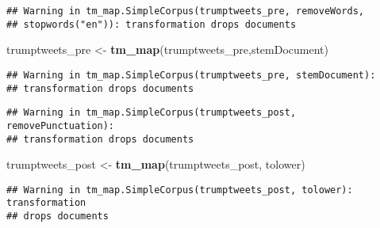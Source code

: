 \documentclass[]{article}
\newenvironment{Shaded}{\begin{snugshade}}{\end{snugshade}}
\newcommand{\KeywordTok}[1]{\textcolor[rgb]{0.13,0.29,0.53}{\textbf{#1}}}
\newcommand{\DecValTok}[1]{\textcolor[rgb]{0.00,0.00,0.81}{#1}}
\newcommand{\StringTok}[1]{\textcolor[rgb]{0.31,0.60,0.02}{#1}}
\newcommand{\OperatorTok}[1]{\textcolor[rgb]{0.81,0.36,0.00}{\textbf{#1}}}
\newcommand{\NormalTok}[1]{#1}
\begin{document}
\begin{verbatim}
## Warning in tm_map.SimpleCorpus(trumptweets_pre, removeWords,
## stopwords("en")): transformation drops documents
\end{verbatim}

\begin{Shaded}
\begin{Highlighting}[]
\NormalTok{trumptweets_pre <-}\StringTok{ }\KeywordTok{tm_map}\NormalTok{(trumptweets_pre,stemDocument)}
\end{Highlighting}
\end{Shaded}

\begin{verbatim}
## Warning in tm_map.SimpleCorpus(trumptweets_pre, stemDocument):
## transformation drops documents
\end{verbatim}

\begin{Shaded}
\end{Shaded}

\begin{verbatim}
## Warning in tm_map.SimpleCorpus(trumptweets_post, removePunctuation):
## transformation drops documents
\end{verbatim}

\begin{Shaded}
\begin{Highlighting}[]
\NormalTok{trumptweets_post <-}\StringTok{ }\KeywordTok{tm_map}\NormalTok{(trumptweets_post, tolower)}
\end{Highlighting}
\end{Shaded}

\begin{verbatim}
## Warning in tm_map.SimpleCorpus(trumptweets_post, tolower): transformation
## drops documents
\end{verbatim}
\end{document}

